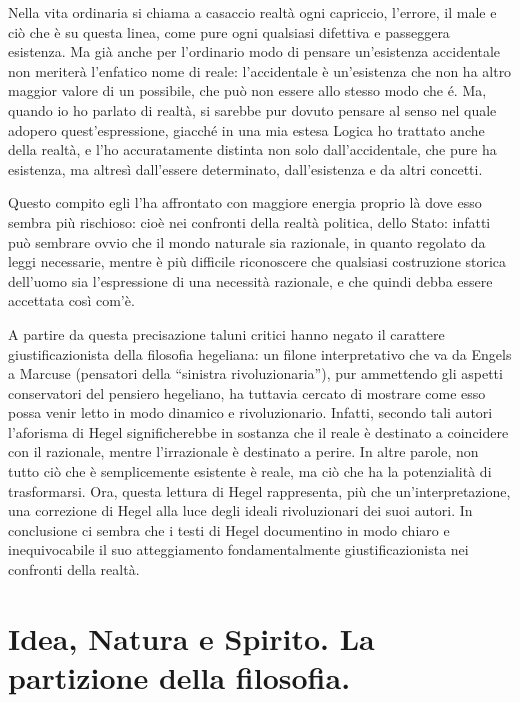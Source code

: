 \documentclass[a4paper,12pt,oneside,openany]{book}%
\begin{document}
Nella vita ordinaria si chiama a casaccio realtà ogni capriccio, l’errore, il male e ciò che è su questa linea, come pure ogni qualsiasi difettiva e passeggera esistenza. Ma già anche per l’ordinario modo di pensare un’esistenza accidentale non meriterà l’enfatico nome di reale: l’accidentale è un’esistenza che non ha altro maggior valore di un possibile, che può non essere allo stesso modo che é. Ma, quando io ho parlato di realtà, si sarebbe pur dovuto pensare al senso nel quale adopero quest’espressione, giacché in una mia estesa Logica ho trattato anche della realtà, e l’ho accuratamente distinta non solo dall’accidentale, che pure ha esistenza, ma altresì dall’essere determinato, dall’esistenza e da altri concetti.

Questo compito egli l’ha affrontato con maggiore energia proprio là dove esso sembra più rischioso: cioè nei confronti della realtà politica, dello Stato: infatti può sembrare ovvio che il mondo naturale sia razionale, in quanto regolato da leggi necessarie, mentre è più difficile riconoscere che qualsiasi costruzione storica dell’uomo sia l’espressione di una necessità razionale, e che quindi debba essere accettata così com’è.

A partire da questa precisazione taluni critici hanno negato il carattere giustificazionista della filosofia hegeliana: un filone interpretativo che va da Engels a Marcuse (pensatori della “sinistra rivoluzionaria”), pur ammettendo gli aspetti conservatori del pensiero hegeliano, ha tuttavia cercato di mostrare come esso possa venir letto in modo dinamico e rivoluzionario. Infatti, secondo tali autori l’aforisma di Hegel significherebbe in sostanza che il reale è destinato a coincidere con il razionale, mentre l’irrazionale è destinato a perire. In altre parole, non tutto ciò che è semplicemente esistente è reale, ma ciò che ha la potenzialità di trasformarsi. Ora, questa lettura di Hegel rappresenta, più che un’interpretazione, una correzione di Hegel alla luce degli ideali rivoluzionari dei suoi autori. In conclusione ci sembra che i testi di Hegel documentino in modo chiaro e inequivocabile il suo atteggiamento fondamentalmente giustificazionista nei confronti della realtà.

\newpage
	
	\section*{Idea, Natura e Spirito. La partizione della filosofia.}
	
\end{document}
